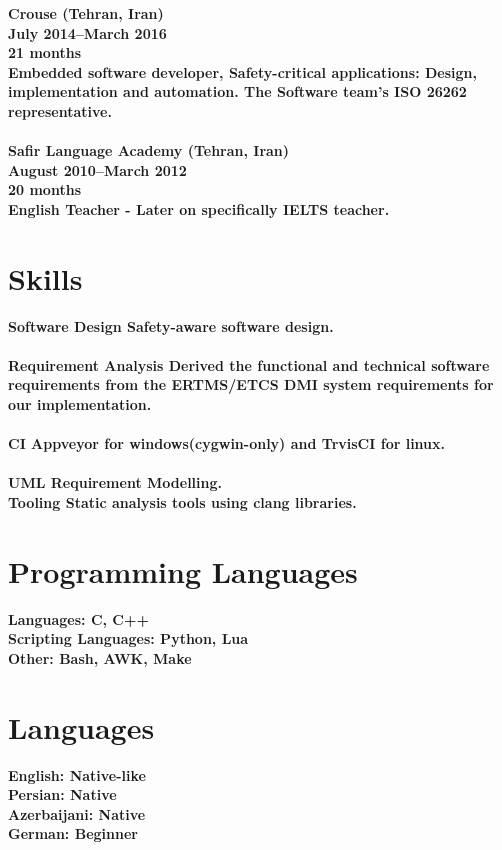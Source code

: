 \documentclass[8pt]{article}
\begin{document}
\begin{multicols}{2}
  \bf Crouse (Tehran, Iran)\\
  July 2014--March 2016\\
  21 months\\
  \normalfont Embedded software developer, Safety-critical applications: Design, implementation and automation. The Software team’s ISO 26262 representative.\\[5pt]
  \\
  \bf Safir Language Academy (Tehran, Iran)\\
  August 2010--March 2012\\
  20 months\\
  \normalfont English Teacher - Later on specifically IELTS teacher.\\[5pt]

  \section*{Skills}
  \bf Software Design \normalfont Safety-aware software design.\\[5pt]
  \\
  \bf Requirement Analysis \normalfont{} Derived the functional and technical software requirements from the ERTMS/ETCS DMI system requirements for our implementation.\\[5pt]
  \\
  \bf CI \normalfont Appveyor for windows(cygwin-only) and TrvisCI for linux.\\[5pt]
  \\
  \bf UML \normalfont Requirement Modelling.\\[5pt]
  \bf Tooling \normalfont Static analysis tools using clang libraries.\\[5pt]

  \section*{Programming Languages}
  \bf Languages: \normalfont C, C++\\[5pt]
  \bf Scripting Languages: \normalfont Python, Lua\\[5pt]
  \bf Other: \normalfont Bash, AWK, Make\\[5pt]

  \section*{Languages}
  \bf English: {\normalfont Native-like}\\
  \bf Persian: {\normalfont Native}\\
  \bf Azerbaijani: {\normalfont Native}\\
  \normalfont German: Beginner\\


\end{multicols}
\end{document}
